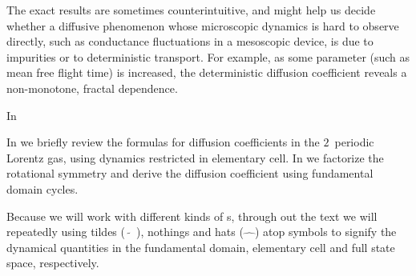 The exact results are sometimes counterintuitive, and might help us
decide whether a diffusive phenomenon whose microscopic dynamics is hard
to observe directly, such as conductance fluctuations in a mesoscopic
device, is due to impurities or to deterministic transport. For example,
as some parameter (such as mean free flight time) is increased, the
deterministic diffusion coefficient reveals a non-monotone, fractal
dependence.

In 

In 
we briefly review the formulas for diffusion
coefficients in the $2$\dmn\ periodic Lorentz gas, using dynamics
restricted in elementary cell.
In  we
factorize the rotational symmetry and derive the diffusion coefficient
using fundamental domain cycles.

Because we will work with different
kinds of \statesp s, through out the text we will repeatedly using tildes
($\tilde{\quad}$), nothings and hats ($\hat{\quad}$) atop symbols to
signify the dynamical quantities in the fundamental domain, elementary
cell and full state space, respectively.
